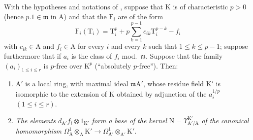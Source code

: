 \begin{proposition}[22.4.4]
\label{0.22.4.4}
With the hypotheses and notations of , suppose that $\mathrm{K}$ is of characteristic $p>0$ (hence $p.1\in\mathfrak{m}$ in $\mathrm{A}$) and that the $\mathrm{F}_i$ are of the form
\[
\label{0.22.4.4.1}
  \mathrm{F}_i(\mathrm{T}_i)=\mathrm{T}_i^p+p\sum_{k=1}^{p-1}c_{ik}\mathrm{T}_i^{p-k}-f_i
  \tag{22.4.4.1}
\]
with $c_{ik}\in\mathrm{A}$ and $f_i\in\mathrm{A}$ for every $i$ and every $k$ such that $1\leq k\leq p-1$; suppose furthermore that if $a_i$ is the class of $f_i$ mod.~$\mathfrak{m}$.
Suppose that the family $(a_i)_{1\leq i\leq r}$ is $p$-free over $\mathrm{K}^p$ (``absolutely $p$-free'').
Then:
\begin{enumerate}
  \item[\rm{(i)}] $\mathrm{A}'$ is a local ring, with maximal ideal $\mathfrak{m}\mathrm{A}'$, whose residue field $\mathrm{K}'$ is isomorphic to the extension of $\mathrm{K}$ obtained by adjunction of the $a_i^{1/p}$ $(1\leq i\leq r)$.
  \item[\rm{(ii)}] \emph{The elements $d_{\mathrm{A}'}f_i\otimes 1_{\mathrm{K}'}$ form a base of the kernel} $\mathrm{N}=\Upsilon^{\mathrm{K}'}_{\mathrm{A}'/\mathrm{A}}$ \emph{of the canonical homomorphism} $\Omega^1_\mathrm{A}\otimes_\mathrm{A}\mathrm{K}'\to\Omega^1_{\mathrm{A}'}\otimes_{\mathrm{A}'}\mathrm{K}'$.
\end{enumerate}
\end{proposition}

